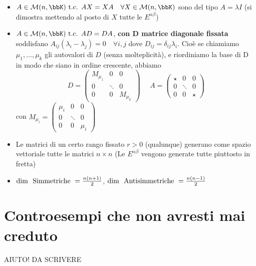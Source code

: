 \documentclass[a4paper,NoNotes,GeneralMath]{stdmdoc}
\newcommand{\Help}{{\color{green} AIUTO! DA SCRIVERE}}
\begin{document}
\begin{itemize}
		\item $A \in \mathcal{M}(n, \bbK) \tc AX = XA \quad \forall X \in \mathcal{M}(n, \bbK)$ sono del tipo $A = \lambda I$ (si dimostra mettendo al posto di $X$ tutte le $E^{\alpha\beta}$)
		\item $A \in \mathcal{M}(n, \bbK) \tc AD = DA$, {\bf con $\bm D$ matrice diagonale fissata} soddisfano $A_{ij}(\lambda_i - \lambda_j) = 0 \quad \forall i,j$ dove $D_{ij} = \delta_{ij}\lambda_i$. Cioè se chiamiamo $\mu_1, \ldots, \mu_k$ gli autovalori di $D$ (senza molteplicità), e riordiniamo la base di D in modo che siano in ordine crescente, abbiamo $$D = \left(\begin{array}{c|c|c} M_{\mu_1} & 0 & 0 \\ \hline 0 & \ddots & 0 \\ \hline 0 & 0 & M_{\mu_k} \end{array}\right) \ \ \ \ \ \ A = \left(\begin{array}{c|c|c} \star & 0 & 0 \\ \hline 0 & \ddots & 0 \\ \hline 0 & 0 & \star \end{array}\right) $$ con $M_{\mu_i} = \left(\begin{array}{ccc} \mu_i & 0 & 0 \\ 0 & \ddots & 0 \\ 0 & 0 & \mu_i \end{array}\right)$
		\item Le matrici di un certo rango fissato $r > 0$ (qualunque) generano come spazio vettoriale tutte le matrici $n\times n$ (Le $E^{\alpha\beta}$ vengono generate tutte piuttosto in fretta)
		\item $\mbox{dim } \mbox{ Simmetriche } = \frac{n(n+1)}{2}$, $\mbox{dim } \mbox{ Antisimmetriche } = \frac{n(n-1)}{2}$
	\end{itemize}

	\section*{Controesempi che non avresti mai creduto}
	\Help
	
\end{document}
